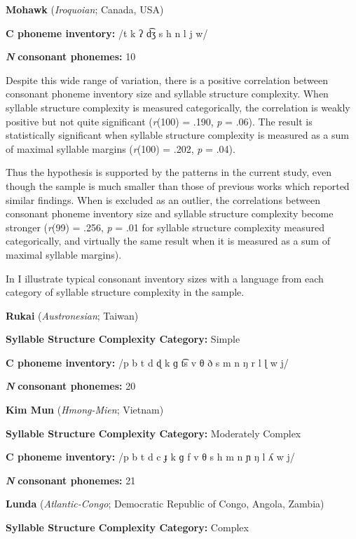 \ea\label{ex:4.21}
  \textbf{Mohawk} (\textit{Iroquoian}; Canada, USA)

\textbf{C phoneme inventory:} /t k ʔ d͡ʒ s h n l j w/

\textbf{\textit{N}} \textbf{consonant phonemes:} 10
\z

  Despite this wide range of variation, there is a positive correlation between consonant phoneme inventory size and syllable structure complexity. When syllable structure complexity is measured categorically, the correlation is weakly positive but not quite significant (\textit{r}(100) = .190, \textit{p} = .06). The result is statistically significant when syllable structure complexity is measured as a sum of maximal syllable margins (\textit{r}(100) = .202, \textit{p} = .04).

  Thus the hypothesis is supported by the patterns in the current study, even though the sample is much smaller than those of previous works which reported similar findings. When  is excluded as an outlier, the correlations between consonant phoneme inventory size and syllable structure complexity become stronger (\textit{r}(99) = .256, \textit{p} = .01 for syllable structure complexity measured categorically, and virtually the same result when it is measured as a sum of maximal syllable margins).

  In  I illustrate typical consonant inventory sizes with a language from each category of syllable structure complexity in the sample.

\ea\label{ex:4.22}
  \textbf{Rukai} (\textit{Austronesian}; Taiwan)

\textbf{Syllable Structure Complexity Category:} Simple

\textbf{C phoneme inventory:} /p b t d ɖ k ɡ t͡s v θ ð s m n ŋ r l ɭ w j/

\textbf{\textit{N}} \textbf{consonant phonemes:} 20
\z

\ea\label{ex:4.23}
  \textbf{Kim Mun} (\textit{Hmong-Mien}; Vietnam)

\textbf{Syllable Structure Complexity Category:} Moderately Complex

\textbf{C phoneme inventory:} /p b t d c ɟ k ɡ f v θ s h m n ɲ ŋ l ʎ w j/

\textbf{\textit{N}} \textbf{consonant phonemes:} 21
\z

\ea\label{ex:4.24}
  \textbf{Lunda} (\textit{Atlantic-Congo}; Democratic Republic of Congo, Angola, Zambia)

\textbf{Syllable Structure Complexity Category:} Complex

